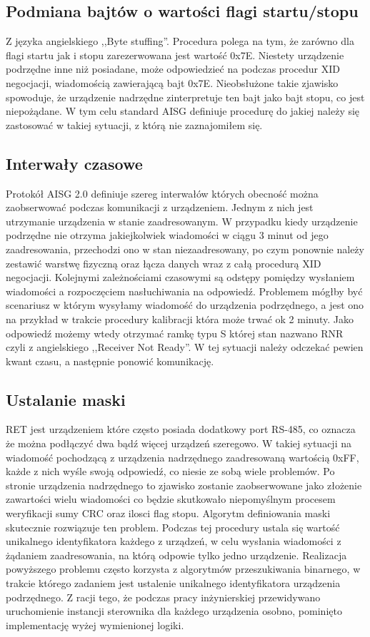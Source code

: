     \subsection{Podmiana bajtów o wartości flagi startu/stopu}
    Z języka angielskiego ,,Byte stuffing''. Procedura polega na tym, że zarówno dla flagi startu jak i stopu zarezerwowana jest wartość 0x7E.
    Niestety urządzenie podrzędne inne niż posiadane, może odpowiedzieć na podczas procedur XID negocjacji, wiadomością zawierającą bajt 0x7E. Nieobsłużone
    takie zjawisko spowoduje, że urządzenie nadrzędne zinterpretuje ten bajt jako bajt stopu, co jest niepożądane\cite{ISO-IEC-13239}. W tym celu standard AISG 
    definiuje procedurę do jakiej należy się zastosować w takiej sytuacji, z którą nie zaznajomiłem się.

    \subsection{Interwały czasowe}
    Protokół AISG 2.0 definiuje szereg interwałów których obecność można zaobserwować podczas komunikacji z urządzeniem. Jednym z nich jest
    utrzymanie urządzenia w stanie zaadresowanym. W przypadku kiedy urządzenie podrzędne nie otrzyma jakiejkolwiek wiadomości w ciągu 3 minut
    od jego zaadresowania, przechodzi ono w stan niezaadresowany, po czym ponownie należy zestawić warstwę fizyczną oraz łącza danych wraz
    z całą procedurą XID negocjacji. Kolejnymi zależnościami czasowymi są odstępy pomiędzy wysłaniem wiadomości a rozpoczęciem nasłuchiwania na odpowiedź.
    Problemem mógłby być scenariusz w którym wysyłamy wiadomość do urządzenia podrzędnego, a jest ono na przykład w trakcie procedury kalibracji która może 
    trwać ok 2 minuty. Jako odpowiedź możemy wtedy otrzymać ramkę typu S której stan nazwano RNR czyli z angielskiego ,,Receiver Not Ready''. 
    W tej sytuacji należy odczekać pewien kwant czasu, a następnie ponowić komunikację.

    \subsection{Ustalanie maski}
    RET jest urządzeniem które często posiada dodatkowy port RS-485, co oznacza że można podłączyć dwa bądź więcej urządzeń szeregowo. 
    W takiej sytuacji na wiadomość pochodzącą z urządzenia nadrzędnego zaadresowaną wartością 0xFF, każde z nich wyśle swoją odpowiedź, co niesie ze sobą wiele problemów.
    Po stronie urządzenia nadrzędnego to zjawisko zostanie zaobserwowane jako złożenie zawartości wielu wiadomości co będzie skutkowało niepomyślnym
    procesem weryfikacji sumy CRC oraz ilosci flag stopu. Algorytm definiowania maski skutecznie rozwiązuje ten problem. 
    Podczas tej procedury ustala się wartość unikalnego identyfikatora każdego z urządzeń, w celu wysłania wiadomości z żądaniem zaadresowania,
    na którą odpowie tylko jedno urządzenie. Realizacja powyższego problemu często korzysta z algorytmów przeszukiwania binarnego, w trakcie którego
    zadaniem jest ustalenie unikalnego identyfikatora urządzenia podrzędnego. Z racji tego, że podczas pracy inżynierskiej
    przewidywano uruchomienie instancji sterownika dla każdego urządzenia osobno, pominięto implementację wyżej wymienionej logiki.

